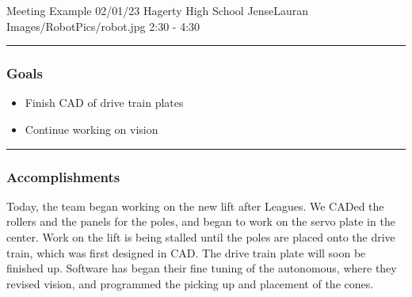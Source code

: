\insertmeeting 
	{Meeting Example} 
	{02/01/23} 
	{Hagerty High School}
	{JenseLauran}
	{Images/RobotPics/robot.jpg}
	{2:30 - 4:30}
	
\noindent\hfil\rule{\textwidth}{.4pt}\hfil
\subsubsection*{Goals}
\begin{itemize}
    \item Finish CAD of drive train plates
    \item Continue working on vision
\end{itemize} 

\noindent\hfil\rule{\textwidth}{.4pt}\hfil

\subsubsection*{Accomplishments}
Today, the team began working on the new lift after Leagues. We CADed the rollers and the panels for the poles, and began to work on the servo plate in the center. Work on the lift is being stalled until the poles are placed onto the drive train, which was first designed in CAD. The drive train plate will soon be finished up. Software has began their fine tuning of the autonomous, where they revised vision, and programmed the picking up and placement of the cones.
 


